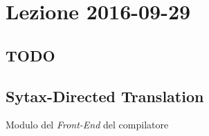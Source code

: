 \section{Lezione 2016-09-29}
\subsection{TODO}

\subsection{Sytax-Directed Translation}
Modulo del \textit{Front-End} del compilatore
